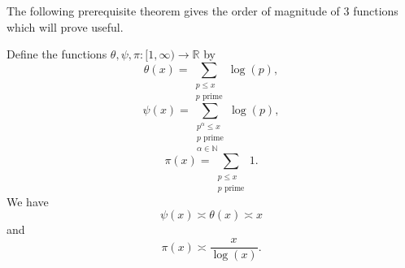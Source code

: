 \documentclass[12pt,reqno]{amsart}
\begin{document}
The following prerequisite theorem gives the order of magnitude of 3 functions which
will prove useful.

\begin{theorem}
Define the functions \(\theta,\psi, \pi : [1, \infty) \to \mathbb{R} \) by
\[
    \theta(x) = \sum _{\substack{ p \leq x \\ p \text{ prime}  }} \log \left( p \right) 
,\]
\[
    \psi(x) = \sum _{\substack{ p^{\alpha} \leq x \\ p \text{ prime} \\ \alpha \in \mathbb{N}  }} \log \left( p \right) 
,\]
\[
    \pi(x) = \sum _{\substack{ p \leq x \\ p \text{ prime}  }} 1
.\]
We have
\[
    \psi(x) \asymp \theta(x) \asymp x
\]
and
\[
    \pi(x) \asymp \frac{x}{\log \left( x \right) } 
.\]
\end{theorem}
\end{document}
